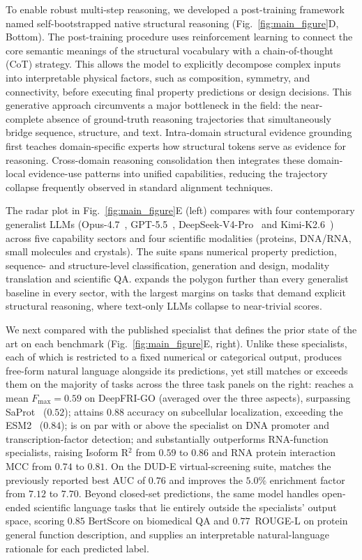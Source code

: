 To enable robust multi-step reasoning, we developed a post-training framework named self-bootstrapped native structural reasoning (Fig.~\ref{fig:main_figure}D, Bottom). The post-training procedure uses reinforcement learning to connect the core semantic meanings of the structural vocabulary with a chain-of-thought (CoT) strategy. This allows the model to explicitly decompose complex inputs into interpretable physical factors, such as composition, symmetry, and connectivity, before executing final property predictions or design decisions. This generative approach circumvents a major bottleneck in the field: the near-complete absence of ground-truth reasoning trajectories that simultaneously bridge sequence, structure, and text. 
Intra-domain structural evidence grounding first teaches domain-specific experts how structural tokens serve as evidence for reasoning. 
Cross-domain reasoning consolidation then integrates these domain-local evidence-use patterns into unified capabilities, reducing the trajectory collapse frequently observed in standard alignment techniques.

The radar plot in Fig.~\ref{fig:main_figure}E (left) compares \projName{} with four contemporary generalist LLMs (Opus-4.7~\citep{opus47}, GPT-5.5~\citep{openai2026gpt55}, DeepSeek-V4-Pro~\citep{deepseekai2026deepseekv4} and Kimi-K2.6~\citep{kimik26}) across five capability sectors and four scientific modalities (proteins, DNA/RNA, small molecules and crystals). The suite spans numerical property prediction, sequence- and structure-level classification, generation and design, modality translation and scientific QA. \projName{} expands the polygon further than every generalist baseline in every sector, with the largest margins on tasks that demand explicit structural reasoning, where text-only LLMs collapse to near-trivial scores.

We next compared \projName{} with the published specialist that defines the prior state of the art on each benchmark (Fig.~\ref{fig:main_figure}E, right). Unlike these specialists, each of which is restricted to a fixed numerical or categorical output, \projName{} produces free-form natural language alongside its predictions, yet still matches or exceeds them on the majority of tasks across the three task panels on the right: \projName{} reaches a mean $F_{\max}=0.59$ on DeepFRI-GO (averaged over the three aspects), surpassing SaProt~\citep{su2025saprothub} ($0.52$); attains $0.88$ accuracy on subcellular localization, exceeding the ESM2~\citep{esm2} ($0.84$); is on par with or above the specialist on DNA promoter and transcription-factor detection; and substantially outperforms RNA-function specialists, raising Isoform R$^2$ from $0.59$ to $0.86$ and RNA protein interaction MCC from $0.74$ to $0.81$. On the DUD-E virtual-screening suite, \projName{} matches the previously reported best AUC of $0.76$ and improves the $5.0\%$ enrichment factor from $7.12$ to $7.70$. Beyond closed-set predictions, the same model handles open-ended scientific language tasks that lie entirely outside the specialists' output space, scoring $0.85$ BertScore on biomedical QA and $0.77$~ROUGE-L on protein general function description, and supplies an interpretable natural-language rationale for each predicted label.

